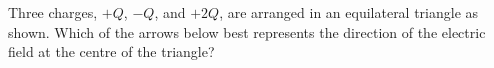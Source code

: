 \documentclass{../../../oss-apphys-exam}
\newcounter{last}
\begin{document}
\begin{questions}
  \question Three charges, $+Q$, $-Q$, and $+2Q$, are arranged in an
  equilateral triangle as shown. Which of the arrows below best represents the
  direction of the electric field at the centre of the triangle?
  \begin{center}
    \vspace{-.1in}
  \end{center}
  \begin{choices}
    \choice {\Huge$\downarrow$}
    \choice {\Huge$\uparrow$}
    \choice {\Huge$\searrow$}
    \choice {\Huge$\swarrow$}
    \choice {\Huge$\nearrow$}
  \end{choices}
\end{questions}
\setcounter{last}{\value{question}}
\newpage



  
\end{document}
